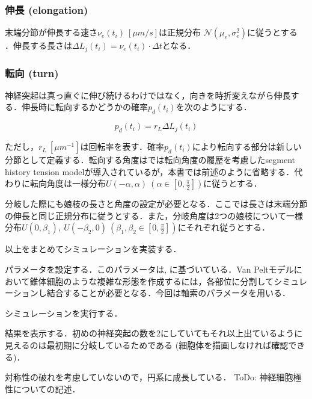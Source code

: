 \subsubsection{伸長 (elongation) }
末端分節が伸長する速さ$\nu_e(t_i)\ [\mu m/s]$は正規分布 $\mathcal{N}(\mu_e, \sigma_e^2)$に従うとする \citep{Van_Ooyen2014-fb}．伸長する長さは$\Delta L_j(t_i)=\nu_e(t_i) \cdot \Delta t$となる．

\subsubsection{転向 (turn)}
神経突起は真っ直ぐに伸び続けるわけではなく，向きを時折変えながら伸長する．伸長時に転向するかどうかの確率$p_d(t_i)$を次のようにする．


\begin{equation}
p_d(t_i) = r_L\Delta L_j(t_i)
\end{equation}


ただし，$r_L\ [\mu m^{-1}]$は回転率を表す．確率$p_d(t_i)$により転向する部分は新しい分節として定義する．転向する角度は\citep{Koene2009-hv}では転向角度の履歴を考慮したsegment history tension modelが導入されているが，本書では前述のように省略する．代わりに転向角度は一様分布$U(-\alpha, \alpha)\ \left(\alpha\in \left[0, \frac{\pi}{2}\right]\right)$に従うとする．

分岐した際にも娘枝の長さと角度の設定が必要となる．ここでは長さは末端分節の伸長と同じ正規分布に従うとする．また，分岐角度は2つの娘枝について一様分布$U(0, \beta_1),\ U(-\beta_2, 0)\ \left(\beta_1, \beta_2\in \left[0, \frac{\pi}{2}\right]\right)$にそれぞれ従うとする．

以上をまとめてシミュレーションを実装する．

パラメータを設定する．このパラメータは\citep{Koene2009-hv}, \citep{Van_Ooyen2014-fb}に基づいている．Van Peltモデルにおいて錐体細胞のような複雑な形態を作成するには，各部位に分割してシミュレーションし結合することが必要となる．今回は軸索のパラメータを用いる．

シミュレーションを実行する．

結果を表示する．初めの神経突起の数を2にしていてもそれ以上出ているように見えるのは最初期に分岐しているためである (細胞体を描画しなければ確認できる)．


対称性の破れを考慮していないので，円系に成長している．
ToDo: 神経細胞極性についての記述．

